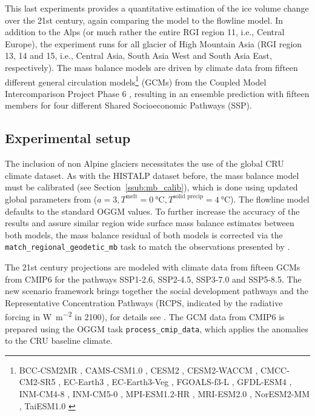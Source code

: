     This last experiments provides a quantitative estimation of the ice volume change over the 21st century, again comparing the \vas{} model to the flowline model. In addition to the Alps (or much rather the entire RGI region 11, i.e., Central Europe), the experiment runs for all glacier of High Mountain Asia (RGI region 13, 14 and 15, i.e., Central Asia, South Asia West and South Asia East, respectively). The mass balance models are driven by climate data from fifteen different general circulation models\footnote{BCC-CSM2MR \citep{CMIP6-BCC-CSM2MR}, CAMS-CSM1.0 \citep{CMIP6-CAMS-CSM1.0}, CESM2 \citep{CMIP6-CESM2}, CESM2-WACCM \citep{CMIP6-CESM2-WACCM}, CMCC-CM2-SR5 \citep{CMIP6-CMCC-CM2-SR5}, EC-Earth3 \citep{CMIP6-EC-Earth3}, EC-Earth3-Veg \citep{CMIP6-EC-Earth3-Veg}, FGOALS-f3-L \citep{CMIP6-FGOALS-f3-L}, GFDL-ESM4 \citep{CMIP6-GFDL-ESM4}, INM-CM4-8 \citep{CMIP6-INM-CM4-8}, INM-CM5-0 \citep{CMIP6-INM-CM5-0}, MPI-ESM1.2-HR \citep{CMIP6-MPI-ESM1.2-HR-DKRZ, CMIP6-MPI-ESM1.2-HR-DWD}, MRI-ESM2.0 \citep{CMIP6-MRI-ESM2.0}, NorESM2-MM \citep{CMIP6-NorESM2-MM}, TaiESM1.0 \citep{CMIP6-TaiESM1.0}} (GCMs) from the Coupled Model Intercomparison Project Phase 6 \citep[CMIP6, ][]{Eyring2016_CMIP}, resulting in an ensemble prediction with fifteen members for four different Shared Socioeconomic Pathways (SSP).

    \subsection{Experimental setup} %
    \label{sub:experimental_setup_projections}

      The inclusion of non Alpine glaciers necessitates the use of the global CRU climate dataset. As with the HISTALP dataset before, the \vas{} mass balance model must be calibrated (see Section~\ref{ssub:mb_calib}), which is done using updated global parameters from \citet{Malles2020} ($a = 3, T^\text{melt} = \SI{0}{\celsius}, T^\text{solid precip} = \SI{4}{\celsius}$). The flowline model defaults to the standard OGGM values. To further increase the accuracy of the results and assure similar region wide surface mass balance estimates between both models, the mass balance residual \bias{} of both models is corrected via the \lstinline`match_regional_geodetic_mb` task to match the observations presented by \citet{Hugonnet2020}. 

      The 21st century projections are modeled with climate data from fifteen GCMs from CMIP6 for the pathways SSP1-2.6, SSP2-4.5, SSP3-7.0 and SSP5-8.5. The new scenario framework brings together the social development pathways and the Representative Concentration Pathways (RCPS, indicated by the radiative forcing in \si{\watt\per\square\meter} in 2100), for details see \citet{ONeill2016, Riahi2017}.  The GCM data from CMIP6 is prepared using the OGGM task \lstinline`process_cmip_data`, which applies the anomalies to the CRU baseline climate.
      
